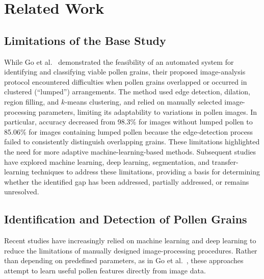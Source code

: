 \newpage
\section{Related Work}
\label{ch:related-work}

\subsection{Limitations of the Base Study}
\label{sec:rw-base-study}

While Go et al.~\cite{go2019} demonstrated the feasibility of an automated system for identifying and classifying viable pollen grains, their proposed image-analysis protocol encountered difficulties when pollen grains overlapped or occurred in clustered (``lumped'') arrangements. The method used edge detection, dilation, region filling, and $k$-means clustering, and relied on manually selected image-processing parameters, limiting its adaptability to variations in pollen images. In particular, accuracy decreased from 98.3\% for images without lumped pollen to 85.06\% for images containing lumped pollen because the edge-detection process failed to consistently distinguish overlapping grains. These limitations highlighted the need for more adaptive machine-learning-based methods. Subsequent studies have explored machine learning, deep learning, segmentation, and transfer-learning techniques to address these limitations, providing a basis for determining whether the identified gap has been addressed, partially addressed, or remains unresolved.

\subsection{Identification and Detection of Pollen Grains}
\label{sec:rw-detection}

Recent studies have increasingly relied on machine learning and deep learning to reduce the limitations of manually designed image-processing procedures. Rather than depending on predefined parameters, as in Go et al.~\cite{go2019}, these approaches attempt to learn useful pollen features directly from image data.

